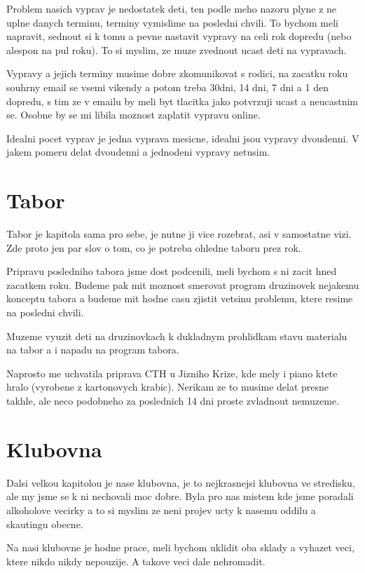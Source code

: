 \documentclass[12pt,a4paper]{article}
\begin{document}
Problem nasich vyprav je nedostatek deti, ten podle meho nazoru plyne z ne uplne danych terminu, terminy vymislime na posledni chvili. To bychom meli napravit, sednout si k tomu a pevne nastavit vypravy na celi rok dopredu (nebo alespon na pul roku). To si myslim, ze muze zvednout ucast deti na vypravach.

Vypravy a jejich terminy musime dobre zkomunikovat s rodici, na zacatku roku souhrny email se vsemi vikendy a potom treba 30dni, 14 dni, 7 dni a 1 den dopredu, s tim ze v emailu by meli byt tlacitka jako potvrzuji ucast a neucastnim se. Osobne by se mi libila moznost zaplatit vypravu online.

Idealni pocet vyprav je jedna vyprava mesicne, idealni jsou vypravy dvoudenni. V jakem pomeru delat dvoudenni a jednodeni vypravy netusim.


\section{Tabor}

Tabor je kapitola sama pro sebe, je nutne ji vice rozebrat, asi v samostatne vizi. Zde proto jen par slov o tom, co je potreba ohledne taboru prez rok.

Pripravu posledniho tabora jsme dost podcenili, meli bychom s ni zacit hned zacatkem roku. Budeme pak mit moznost smerovat program druzinovek nejakemu konceptu tabora a budeme mit hodne casu zjistit vetsinu problemu, ktere resime na posledni chvili.

Muzeme vyuzit deti na druzinovkach k dukladnym prohlidkam stavu materialu na tabor a i napadu na program tabora.

Naprosto me uchvatila priprava CTH u Jizniho Krize, kde mely i piano ktete hralo (vyrobene z kartonovych krabic). Nerikam ze to musime delat presne takhle, ale neco podobneho za poslednich 14 dni proste zvladnout nemuzeme.


\section{Klubovna}

Dalsi velkou kapitolou je nase klubovna, je to nejkrasnejsi klubovna ve stredisku, ale my jsme se k ni nechovali moc dobre. Byla pro nas mistem kde jsme poradali alkoholove vecirky a to si myslim ze neni projev ucty k nasemu oddilu a skautingu obecne.

Na nasi klubovne je hodne prace, meli bychom uklidit oba sklady a vyhazet veci, ktere nikdo nikdy nepouzije. A takove veci dale nehromadit.
\end{document}
